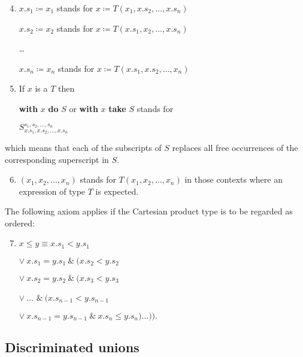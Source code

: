 \begin{enumerate}[leftmargin=2\parindent, label=(\arabic*)]
	\setcounter{enumi}{3}
	\item $x.s_1 \coloneq x_1$ stands for $x\coloneq T(x_1, x.s_2, \dots, x.s_n)$

	$x.s_2 \coloneq x_2$ stands for $x\coloneq T(x.s_1, x_2, \dots, x.s_n)$

	\qquad \dots

	$x.s_n \coloneq x_n$ stands for $x\coloneq T(x.s_1, x.s_2, \dots, x_n)$

	\item If $x$ is a $T$ then
	
	\textbf{with} $x$ \textbf{do} $S$ or \textbf{with} $x$ \textbf{take} $S$ stands for
	
	\quad $S_{x.s_1, x.s_2, \dots, x.s_n}^{s_1, s_2, \dots, s_n}$
\end{enumerate}

\noindent
which means that each of the subscripts of $S$ replaces all free occurrences of the corresponding superscript in $S$.

\begin{enumerate}[leftmargin=2\parindent, label=(\arabic*)]
	\setcounter{enumi}{5}
	\item $(x_1, x_2, \dots, x_n)$ stands for $T(x_1, x_2, \dots, x_n)$ in those contexts where an expression of type $T$ is expected.
\end{enumerate}

The following axiom applies if the Cartesian product type is to be regarded as ordered:
	
\begin{enumerate}[leftmargin=2\parindent, label=(\arabic*)]
	\setcounter{enumi}{6}
	\item $x \leqslant y \equiv$\quad $x.s_1 < y.s_1$
		
	\tabto*{3.2em}$\vee\ x.s_1 = y.s_1\ \&\ (x.s_2 < y.s_2$
	
	\tabto*{3.2em}$\vee\ x.s_2 = y.s_2\ \&\ (x.s_3 < y.s_3$
	
	\tabto*{3.2em}$\vee\ \dots$ \tabto*{8.6em}$\&\ (x.s_{n - 1} < y.s_{n-1}$
	
	\tabto*{3.2em}$\vee\ x.s_{n-1} = y.s_{n-1}\ \&\ x.s_n \leqslant y.s_n)\dots)).$
\end{enumerate}

\subsection{Discriminated unions}

